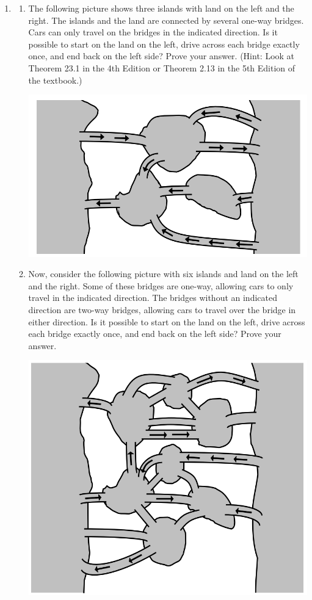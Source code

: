 \documentclass{article}
\begin{document}
\begin{enumerate}
\pagebreak

\item 
	\begin{enumerate}
	\item The following picture shows three islands with land on the left and the right. The
	islands and the land are connected by several one-way bridges. Cars can only
	travel on the bridges in the indicated direction. Is it possible to start on the land
	on the left, drive across each bridge exactly once, and end back on the left side?
	Prove your answer. (Hint: Look at Theorem 23.1 in the 4th Edition or Theorem
	2.13 in the 5th Edition of the textbook.)

	\begin{center}
		\includegraphics[width=.6\textwidth]{bridge1.png}
	\end{center}


	\item Now, consider the following picture with six islands and land on the left and
	the right. Some of these bridges are one-way, allowing cars to only travel in
	the indicated direction. The bridges without an indicated direction are two-way
	bridges, allowing cars to travel over the bridge in either direction. Is it possible
	to start on the land on the left, drive across each bridge exactly once, and end
	back on the left side? Prove your answer.

	\begin{center}
		\includegraphics[width=.6\textwidth]{bridge2.png}
	\end{center}
	\end{enumerate}
\end{enumerate}
\end{document}
